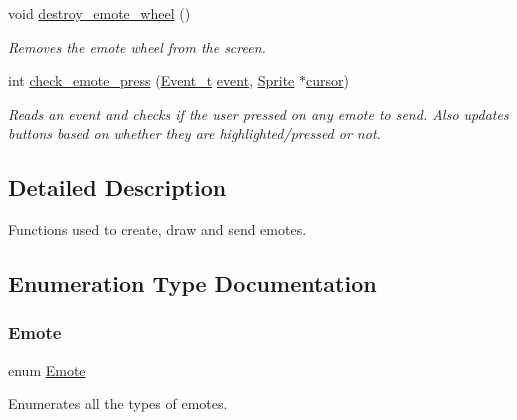 \begin{DoxyCompactItemize}
void \mbox{\hyperlink{group__emote_ga96db30bf99d18ac5410e84902ac4004b}{destroy\+\_\+emote\+\_\+wheel}} ()
\begin{DoxyCompactList}\small\item\em Removes the emote wheel from the screen. \end{DoxyCompactList}\item 
int \mbox{\hyperlink{group__emote_ga7606e9c716a83ec1b05215dcdd6cfc55}{check\+\_\+emote\+\_\+press}} (\mbox{\hyperlink{struct_event__t}{Event\+\_\+t}} \mbox{\hyperlink{pengoo_8c_af662780d461acf9ac3b1321884e7cb01}{event}}, \mbox{\hyperlink{struct_sprite}{Sprite}} $\ast$\mbox{\hyperlink{pengoo_8c_a3a7ea4305773abf5347bb261a8a5c16b}{cursor}})
\begin{DoxyCompactList}\small\item\em Reads an event and checks if the user pressed on any emote to send. Also updates buttons based on whether they are highlighted/pressed or not. \end{DoxyCompactList}\end{DoxyCompactItemize}


\subsection{Detailed Description}
Functions used to create, draw and send emotes. 

\subsection{Enumeration Type Documentation}
\mbox{\label{group__emote_ga0e527855c554e31654c9beb340145574}} 
\subsubsection{\texorpdfstring{Emote}{Emote}}
{\footnotesize\ttfamily enum \mbox{\hyperlink{group__emote_ga0e527855c554e31654c9beb340145574}{Emote}}}



Enumerates all the types of emotes. 

